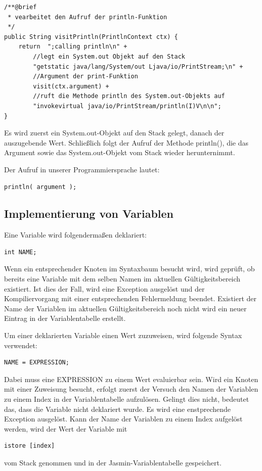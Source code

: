 \scriptsize \begin{lstlisting}[frame=single]
/**@brief
 * vearbeitet den Aufruf der println-Funktion
 */
public String visitPrintln(PrintlnContext ctx) {
	return  ";calling println\n" + 
		//legt ein System.out Objekt auf den Stack
		"getstatic java/lang/System/out Ljava/io/PrintStream;\n" + 	
		//Argument der print-Funktion
		visit(ctx.argument) + 						
		//ruft die Methode println des System.out-Objekts auf
		"invokevirtual java/io/PrintStream/println(I)V\n\n"; 				
}
\end{lstlisting}

\normalsize
Es wird zuerst ein System.out-Objekt auf den Stack gelegt, danach der auszugebende Wert. Schließlich folgt der Aufruf der Methode println(), die das Argument sowie das System.out-Objekt vom Stack wieder herunternimmt.


Der Aufruf in unserer Programmiersprache lautet: 
\begin{lstlisting}[frame=single]
println( argument );
\end{lstlisting}

\subsection{Implementierung von Variablen}
Eine Variable wird folgendermaßen deklariert:
\begin{lstlisting}[frame=single]
int NAME;
\end{lstlisting}
Wenn ein entsprechender Knoten im Syntaxbaum besucht wird, wird geprüft, ob bereits eine Variable mit dem selben Namen im aktuellen Gültigkeitsbereich existiert. Ist dies der Fall, wird eine Exception ausgelöst und der Kompiliervorgang mit einer entsprechenden Fehlermeldung beendet. Existiert der Name der Variablen im aktuellen Gültigkeitsbereich noch nicht wird ein neuer Eintrag in der Variablentabelle erstellt.

Um einer deklarierten Variable einen Wert zuzuweisen, wird folgende Syntax verwendet:
\begin{lstlisting}[frame=single]
NAME = EXPRESSION;
\end{lstlisting}
Dabei muss eine EXPRESSION zu einem Wert evaluierbar sein.
Wird ein Knoten mit einer Zuweisung besucht, erfolgt zuerst der Versuch den Namen der Variablen zu einem Index in der Variablentabelle aufzulösen. Gelingt dies nicht, bedeutet das, dass die Variable nicht deklariert wurde. Es wird eine enstprechende Exception ausgelöst. Kann der Name der Variablen zu einem Index aufgelöst werden, wird der Wert der Variable mit 
\begin{lstlisting}[frame=single]
istore [index]
\end{lstlisting}
vom Stack genommen und in der Jasmin-Variablentabelle gespeichert.

